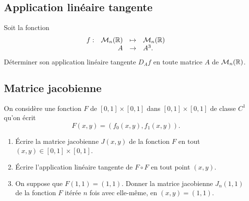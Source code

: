 \subsection{Application linéaire tangente}

\begin{exercise} \label{MultiVar-Tangente}
  Soit la fonction
  $$
  \begin{array}{rrcl}
    f :  & \mathcal{M}_n(\mathbb{R}) & \mapsto & \mathcal{M}_n(\mathbb{R}) \\
    & A & \rightarrow & A^3.
  \end{array}
  $$
  Déterminer son application linéaire tangente $D_A f$ en toute matrice $A$ de $\mathcal{M}_n(\mathbb{R})$.
\end{exercise}

\solution{\todo{}}

\subsection{Matrice jacobienne}

\begin{exercise}[Jacobienne] \label{MultiVar-Jacobienne}
  On considère une fonction $F$ de $[0, 1] \times [0, 1]$ dans $[0, 1] \times [0, 1]$ de classe $C^1$ qu'on écrit
  $$
  F(x, y) = (f_0(x, y), f_1(x, y)).
  $$
  \begin{enumerate}
    \item \'Ecrire la matrice jacobienne $J(x, y)$ de la fonction $F$ en tout $(x, y) \in [0, 1] \times [0, 1]$.
    \item \'Ecrire l'application linéaire tangente de $F \circ F$ en tout point $(x, y)$.
    \item On suppose que $F(1, 1) = (1, 1)$. Donner la matrice jacobienne $J_n(1, 1)$ de la fonction $F$ itérée $n$ fois avec elle-même, en $(x, y) = (1, 1)$.
  \end{enumerate}
\end{exercise}

\solution{\todo{}}

